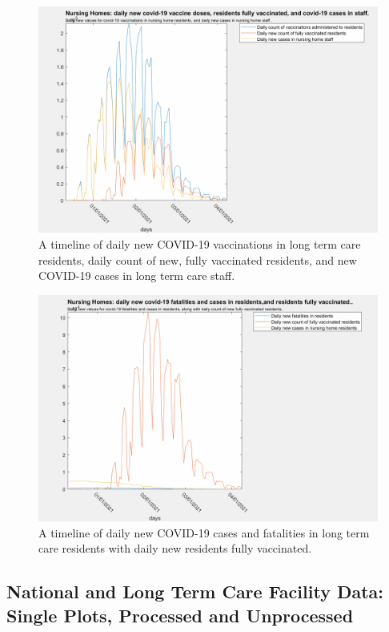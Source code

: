 \documentclass[twoside]{article}
\begin{document}
\begin{multicols}{2}
\begin{figure}[H]
	\includegraphics[width=\linewidth]{images/ltc_fully_vaccinated.png}
	\caption{A timeline of daily new COVID-19 vaccinations in long term care residents, daily count of new, fully vaccinated residents, and new COVID-19 cases in long term care staff.  }
	\label{fig:images/ltc_fully_vaccinatedLabel}
\end{figure}

\begin{figure}[H]
	\includegraphics[width=\linewidth]{images/ltc_daily_cases.png}
	\caption{A timeline of daily new COVID-19 cases and fatalities in long term care residents with daily new residents fully vaccinated.}
	\label{fig:images/ltc_daily_casesLabel}
\end{figure}

\subsection{National and Long Term Care Facility Data: Single Plots, Processed and Unprocessed}


\end{multicols}
\end{document}
